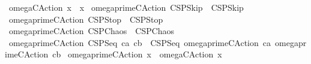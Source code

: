 \begin{isabellebody}
{\isacharbar}\ {\isachardoublequoteopen}omega{\isacharunderscore}CAction\ x\ {\isacharequal}\ x{\isachardoublequoteclose}\isanewline
{\isacharbar}\ {\isachardoublequoteopen}omega{\isacharunderscore}prime{\isacharunderscore}CAction\ CSPSkip\ {\isacharequal}\ CSPSkip{\isachardoublequoteclose}\isanewline
{\isacharbar}\ {\isachardoublequoteopen}omega{\isacharunderscore}prime{\isacharunderscore}CAction\ CSPStop\ {\isacharequal}\ CSPStop{\isachardoublequoteclose}\isanewline
{\isacharbar}\ {\isachardoublequoteopen}omega{\isacharunderscore}prime{\isacharunderscore}CAction\ CSPChaos\ {\isacharequal}\ CSPChaos{\isachardoublequoteclose}\isanewline
{\isacharbar}\ {\isachardoublequoteopen}omega{\isacharunderscore}prime{\isacharunderscore}CAction\ {\isacharparenleft}CSPSeq\ ca\ cb{\isacharparenright}\ {\isacharequal}\ {\isacharparenleft}CSPSeq\ {\isacharparenleft}omega{\isacharunderscore}prime{\isacharunderscore}CAction\ ca{\isacharparenright}\ {\isacharparenleft}omega{\isacharunderscore}prime{\isacharunderscore}CAction\ cb{\isacharparenright}{\isacharparenright}{\isachardoublequoteclose}\isanewline
{\isacharbar}\ {\isachardoublequoteopen}omega{\isacharunderscore}prime{\isacharunderscore}CAction\ x\ {\isacharequal}\ omega{\isacharunderscore}CAction\ x{\isachardoublequoteclose}\isanewline
\isanewline
%
\isadelimtheory
\isanewline
%
\endisadelimtheory
%
\isatagtheory
{}\isamarkupfalse%
%
\endisatagtheory
{\isafoldtheory}%
%
\isadelimtheory
%
\endisadelimtheory
%
\end{isabellebody}%
